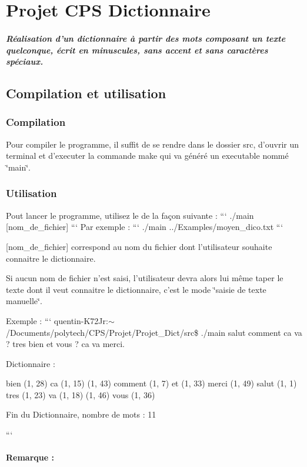 \section*{Projet C\-P\-S Dictionnaire}

\subparagraph*{Réalisation d'un dictionnaire à partir des mots composant un texte quelconque, écrit en minuscules, sans accent et sans caractères spéciaux.}

\subsection*{Compilation et utilisation}

\subsubsection*{Compilation}

Pour compiler le programme, il suffit de se rendre dans le dossier src, d'ouvrir un terminal et d'executer la commande make qui va généré un executable nommé \char`\"{}main\char`\"{}.

\subsubsection*{Utilisation}

Pout lancer le programme, utilisez le de la façon suivante \-: ``` ./main \mbox{[}nom\-\_\-de\-\_\-fichier\mbox{]} ``` Par exemple \-: ``` ./main ../\-Examples/moyen\-\_\-dico.txt ```

\mbox{[}nom\-\_\-de\-\_\-fichier\mbox{]} correspond au nom du fichier dont l'utilisateur souhaite connaitre le dictionnaire.

Si aucun nom de fichier n'est saisi, l'utilisateur devra alors lui même taper le texte dont il veut connaitre le dictionnaire, c'est le mode \char`\"{}saisie de texte manuelle\char`\"{}.

Exemple \-: ``` quentin-\/\-K72\-Jr\-:$\sim$/\-Documents/polytech/\-C\-P\-S/\-Projet/\-Projet\-\_\-\-Dict/src\$ ./main salut comment ca va ? tres bien et vous ? ca va merci. 

 Dictionnaire \-: 

 bien (1, 28) ca (1, 15) (1, 43) comment (1, 7) et (1, 33) merci (1, 49) salut (1, 1) tres (1, 23) va (1, 18) (1, 46) vous (1, 36) 

 Fin du Dictionnaire, nombre de mots \-: 11 

 ```

\paragraph*{Remarque \-:}


